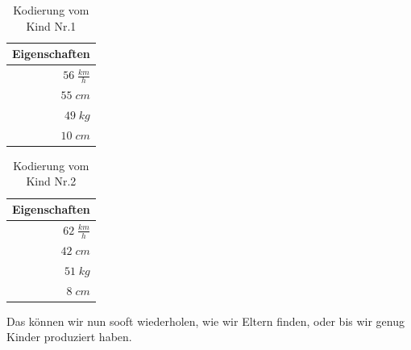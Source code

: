             \begin{multicols}{2}
                \begin{table}[H]
                    \begin{center}
                    \begin{tabular}{ |r| } 
                        \hline
                        \hfill Eigenschaften  \\ \hline
                        \cellcolor{blue!25}   $ 56\; \frac{km}{h}$ \\ \hline
                        \cellcolor{yellow!25} $ 55\; cm          $ \\ \hline
                        \cellcolor{yellow!25} $ 49\; kg          $ \\ \hline
                        \cellcolor{blue!25}   $ 10\; cm          $ \\ \hline
                    \end{tabular}
                    \end{center}
                    \caption{Kodierung vom Kind Nr.1 \label{fig:child-1}}
                \end{table}


                \begin{table}[H]
                    \begin{center}
                    \begin{tabular}{ |r| } 
                        \hline
                        \hfill Eigenschaften  \\ \hline
                        \cellcolor{yellow!25} $ 62\; \frac{km}{h}$ \\ \hline
                        \cellcolor{blue!25}   $ 42\; cm          $ \\ \hline
                        \cellcolor{blue!25}   $ 51\; kg          $ \\ \hline
                        \cellcolor{yellow!25} $  8\; cm          $ \\ \hline
                    \end{tabular}
                    \end{center}
                    \caption{Kodierung vom Kind Nr.2 \label{fig:child-2}}
                \end{table}
            \end{multicols}
            \noindent
            Das können wir nun sooft wiederholen, wie wir Eltern finden, oder bis wir genug Kinder produziert haben.

